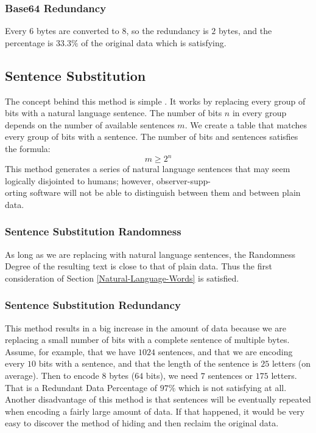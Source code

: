 \documentclass{acm_proc_article-sp}
\begin{document}
\subsubsection{Base64 Redundancy}\label{Base64-Redundancy}
Every $6$ bytes are converted to $8$, so the redundancy is $2$ bytes, and the percentage is $33.3\%$ of the original data which is satisfying.

\subsection{Sentence Substitution}\label{Sentence-Substitution}
The concept behind this method is simple \cite{Stamp}. It works by replacing every group of bits with a natural language sentence. The number of bits $n$ in every group depends on the number of available sentences $m$. We create a table that matches every group of bits with a sentence. The number of bits and sentences satisfies the formula:
\begin{equation*}
    m\geq2^{n}
\end{equation*}
This method generates a series of natural language sentences that may seem logically disjointed to humans; however, observer-supp-\\orting software will not be able to distinguish between them and between plain data.

\subsubsection{Sentence Substitution Randomness}\label{Sentence-Substitution-Randomness}
As long as we are replacing with natural language sentences, the Randomness Degree of the resulting text is close to that of plain data. Thus the first consideration of Section \ref{Natural-Language-Words} is satisfied.

\subsubsection{Sentence Substitution Redundancy}\label{Sentence-Substitution-Redundancy}
This method results in a big increase in the amount of data because we are replacing a small number of bits with a complete sentence of multiple bytes. Assume, for example, that we have $1024$ sentences, and that we are encoding every $10$ bits with a sentence, and that the length of the sentence is $25$ letters (on average). Then to encode $8$ bytes ($64$ bits), we need $7$ sentences or $175$ letters. That is a Redundant Data Percentage of $97\%$ which is not satisfying at all. Another disadvantage of this method is that sentences will be eventually repeated when encoding a fairly large amount of data. If that happened, it would be very easy to discover the method of hiding and then reclaim the original data.
\end{document}
